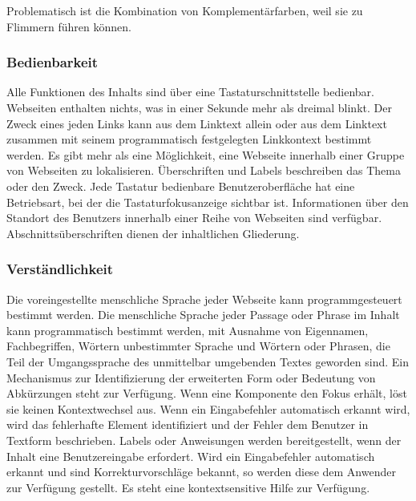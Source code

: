 Problematisch ist die Kombination von Komplementärfarben, weil sie zu Flimmern führen können.~\cite{HellbuschJanEric2011Bvuu}

\subsubsection*{Bedienbarkeit}
Alle Funktionen des Inhalts sind über eine Tastaturschnittstelle bedienbar.
Webseiten enthalten nichts, was in einer Sekunde mehr als dreimal blinkt.
Der Zweck eines jeden Links kann aus dem Linktext allein oder aus dem Linktext zusammen mit seinem programmatisch festgelegten Linkkontext bestimmt werden. Es gibt mehr als eine Möglichkeit, eine Webseite innerhalb einer Gruppe von Webseiten zu lokalisieren. Überschriften und Labels beschreiben das Thema oder den Zweck. Jede Tastatur bedienbare Benutzeroberfläche hat eine Betriebsart, bei der die Tastaturfokusanzeige sichtbar ist. Informationen über den Standort des Benutzers innerhalb einer Reihe von Webseiten sind verfügbar. Abschnittsüberschriften dienen der inhaltlichen Gliederung. 



\subsubsection*{Verständlichkeit}

Die voreingestellte menschliche Sprache jeder Webseite kann programmgesteuert bestimmt werden. Die menschliche Sprache jeder Passage oder Phrase im Inhalt kann programmatisch bestimmt werden, mit Ausnahme von Eigennamen, Fachbegriffen, Wörtern unbestimmter Sprache und Wörtern oder Phrasen, die Teil der Umgangssprache des unmittelbar umgebenden Textes geworden sind. Ein Mechanismus zur Identifizierung der erweiterten Form oder Bedeutung von Abkürzungen steht zur Verfügung.  Wenn eine Komponente den Fokus erhält, löst sie keinen Kontextwechsel aus. Wenn ein Eingabefehler automatisch erkannt wird, wird das fehlerhafte Element identifiziert und der Fehler dem Benutzer in Textform beschrieben. Labels oder Anweisungen werden bereitgestellt, wenn der Inhalt eine Benutzereingabe erfordert.  Wird ein Eingabefehler automatisch erkannt und sind Korrekturvorschläge bekannt, so werden diese dem Anwender zur Verfügung gestellt.  Es steht eine kontextsensitive Hilfe zur Verfügung.



